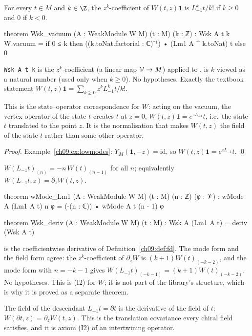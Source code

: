 \begin{theorem}[$W(t,z)\mathbf1=e^{zL_{-1}}t$]\label{ch09:thm:Wvac}
For every $t\in M$ and $k\in\Z$, the $z^k$-coefficient of $W(t,z)\mathbf 1$ is
$L_{-1}^kt/k!$ if $k\ge0$ and $0$ if $k<0$.
\end{theorem}
\begin{leancode}
theorem Wsk_vacuum (A : WeakModule W M) (t : M) (k : ℤ) :
    Wsk A t k W.vacuum
      = if 0 ≤ k then ((k.toNat.factorial : ℂ)⁻¹) • (Lm1 A ^ k.toNat) t else 0
\end{leancode}
\begin{dictionary}
\texttt{Wsk A t k} is the $z^k$-coefficient (a linear map $\mathcal{V}\to M$) applied to
.  is $k$ viewed as a natural number (used only when $k\ge0$). No
hypotheses. Exactly the textbook statement $W(t,z)\mathbf 1=\sum_{k\ge0}z^kL_{-1}^kt/k!$.
\end{dictionary}
\begin{physics}
This is the state--operator correspondence for $W$: acting on the vacuum, the vertex operator of the state $t$ creates $t$ at $z=0$, $W(t,z)\mathbf1=e^{zL_{-1}}t$, i.e.\ the state $t$ translated to the point $z$. It is the normalisation that makes $W(t,z)$ the field of the state $t$ rather than some other operator.
\end{physics}

\noindent\emph{Proof.} Example~\ref{ch09:ex:lowmodes}: $Y_M(\mathbf1,-z)=\mathrm{id}$, so
$W(t,z)\mathbf1=e^{zL_{-1}}t$. \qed

\begin{theorem}\label{ch09:thm:Wderiv}
$W(L_{-1}t)_{(n)}=-n\,W(t)_{(n-1)}$ for all $n$; equivalently $W(L_{-1}t,z)=\partial_zW(t,z)$.
\end{theorem}
\begin{leancode}
theorem wMode_Lm1 (A : WeakModule W M) (t : M) (n : ℤ) (φ : 𝒱) :
    wMode A (Lm1 A t) n φ = (-(n : ℂ)) • wMode A t (n - 1) φ

theorem Wsk_deriv (A : WeakModule W M) (t : M) :
    Wsk A (Lm1 A t) = deriv (Wsk A t)
\end{leancode}
\begin{dictionary}
 is the coefficientwise derivative of Definition~\ref{ch09:def:fd}. The mode form
and the field form agree: the $z^k$-coefficient of $\partial_zW$ is $(k+1)W(t)_{(-k-2)}$, and the
mode form with $n=-k-1$ gives $W(L_{-1}t)_{(-k-1)}=(k+1)W(t)_{(-k-2)}$. No hypotheses. This is
(I2) for $W$; it is not part of the library's  structure, which is why it is
proved as a separate theorem.
\end{dictionary}
\begin{physics}
The field of the descendant $L_{-1}t=\partial t$ is the derivative of the field of $t$: $W(\partial t,z)=\partial_zW(t,z)$. This is the translation covariance every chiral field satisfies, and it is axiom (I2) of an intertwining operator.
\end{physics}

